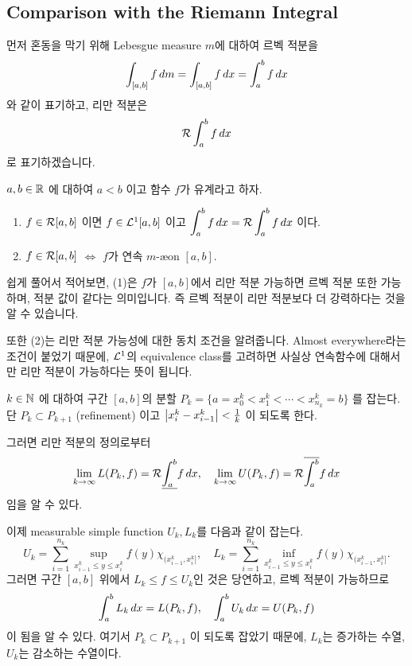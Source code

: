 \subsection*{Comparison with the Riemann Integral}

먼저 혼동을 막기 위해 Lebesgue measure \(m\)에 대하여 르벡 적분을
\[
    \int_{[a, b]} f \,d{m} = \int_{[a, b]} f \,d{x} = \int_a^b f \,d{x}
\]
와 같이 표기하고, 리만 적분은
\[
    \mathcal{R}\int_a^b f\,d{x}
\]
로 표기하겠습니다.

 \(a, b \in \mathbb{R}\) 에 대하여 \(a < b\) 이고 함수 \(f\)가 유계라고 하자.
\begin{enumerate}
    \item \(f \in \mathcal{R}[a, b]\) 이면 \(f \in \mathcal{L}^{1}[a, b]\) 이고 \(\displaystyle \int_a^b f\,d{x} = \mathcal{R}\int_a^b f \,d{x}\) 이다.
    \item \(f \in \mathcal{R}[a, b]\) \(\iff\) \(f\)가 연속 \(m\)-\ae on \([a, b]\).
\end{enumerate}

쉽게 풀어서 적어보면, (1)은 \(f\)가 \([a, b]\)에서 리만 적분 가능하면 르벡 적분 또한 가능하며, 적분 값이 같다는 의미입니다. 즉 르벡 적분이 리만 적분보다 더 강력하다는 것을 알 수 있습니다.

또한 (2)는 리만 적분 가능성에 대한 동치 조건을 알려줍니다. Almost everywhere라는 조건이 붙었기 때문에, \(\mathcal{L}^1\)의 equivalence class를 고려하면 사실상 연속함수에 대해서만 리만 적분이 가능하다는 뜻이 됩니다.

\pf \(k \in \mathbb{N}\) 에 대하여 구간 \([a, b]\)의 분할 \(P_k = \{a = x_0^k < x_1^k < \cdots < x_{n_k}^k = b\}\) 를 잡는다. 단 \(P_k \subset P_{k+1}\) (refinement) 이고 \(\left| x_{i}^k - x_{i-1}^k \right| < \frac{1}{k}\) 이 되도록 한다.

그러면 리만 적분의 정의로부터
\[
    \lim_{k \rightarrow \infty} L(P_k, f) = \mathcal{R}\underline{\int_{a}^{b}} f\,d{x}, \quad \lim_{k \rightarrow \infty} U(P_k, f) = \mathcal{R} \overline{\int_{a}^{b}} f \,d{x}
\]
임을 알 수 있다.

이제 measurable simple function \(U_k, L_k\)를 다음과 같이 잡는다.
\[
    U_k = \sum_{i=1}^{n_k} \sup_{x_{i-1}^k \leq y \leq x_{i}^k} f(y) \chi_{(x_{i-1}^k, x_i^k]}, \quad L_k = \sum_{i=1}^{n_k} \inf_{x_{i-1}^k \leq y \leq x_{i}^k} f(y) \chi_{(x_{i-1}^k, x_i^k]}.
\]
그러면 구간 \([a, b]\) 위에서 \(L_k \leq f \leq U_k\)인 것은 당연하고, 르벡 적분이 가능하므로
\[
    \int_a^b L_k \,d{x} = L(P_k, f), \quad \int_a^b U_k \,d{x} = U(P_k, f)
\]
이 됨을 알 수 있다. 여기서 \(P_k \subset P_{k + 1}\) 이 되도록 잡았기 때문에, \(L_k\)는 증가하는 수열, \(U_k\)는 감소하는 수열이다.

